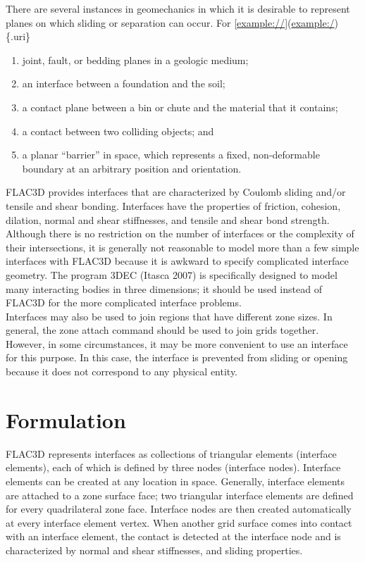 \documentclass[a4paper, nobind]{templates/ociamthesis}
\providecommand{\tightlist}{%
  \setlength{\itemsep}{0pt}\setlength{\parskip}{0pt}}
\begin{document}
There are several instances in geomechanics in which it is desirable to
represent planes on which sliding or separation can occur. For
{[}\url{example://}{]}(\url{example:/})\{.uri\}

\begin{enumerate}
\def\labelenumi{\arabic{enumi}.}
\tightlist
\item
  joint, fault, or bedding planes in a geologic medium;
\item
  an interface between a foundation and the soil;
\item
  a contact plane between a bin or chute and the material that it
  contains;
\item
  a contact between two colliding objects; and
\item
  a planar ``barrier'' in space, which represents a fixed,
  non-deformable boundary at an arbitrary position and orientation.\\
\end{enumerate}

FLAC3D provides interfaces that are characterized by Coulomb sliding
and/or tensile and shear bonding. Interfaces have the properties of
friction, cohesion, dilation, normal and shear stiffnesses, and tensile
and shear bond strength. Although there is no restriction on the number
of interfaces or the complexity of their intersections, it is generally
not reasonable to model more than a few simple interfaces with FLAC3D
because it is awkward to specify complicated interface geometry. The
program 3DEC (Itasca 2007) is specifically designed to model many
interacting bodies in three dimensions; it should be used instead of
FLAC3D for the more complicated interface problems.\\

Interfaces may also be used to join regions that have different zone
sizes. In general, the zone attach command should be used to join grids
together. However, in some circumstances, it may be more convenient to
use an interface for this purpose. In this case, the interface is
prevented from sliding or opening because it does not correspond to any
physical entity.

\hypertarget{formulation}{%
\section{Formulation}\label{formulation}}

FLAC3D represents interfaces as collections of triangular elements
(interface elements), each of which is defined by three nodes (interface
nodes). Interface elements can be created at any location in space.
Generally, interface elements are attached to a zone surface face; two
triangular interface elements are defined for every quadrilateral zone
face. Interface nodes are then created automatically at every interface
element vertex. When another grid surface comes into contact with an
interface element, the contact is detected at the interface node and is
characterized by normal and shear stiffnesses, and sliding properties.\\
\end{document}
